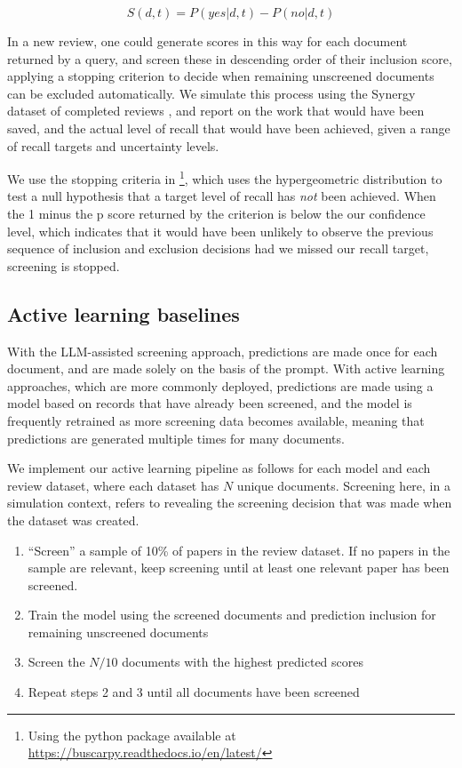 \documentclass{article}
\begin{document}
	\begin{equation}S(d,t) = P(yes|d,t) - P(no|d,t)\end{equation}
	
	In a new review, one could generate scores in this way for each document returned by a query, and screen these in descending order of their inclusion score, applying a stopping criterion to decide when remaining unscreened documents can be excluded automatically.  We simulate this process using the Synergy dataset of completed reviews \cite{de_bruin_synergy_2023}, and report on the work that would have been saved, and the actual level of recall that would have been achieved, given a range of recall targets and uncertainty levels.
	
	We use the stopping criteria in \cite{callaghan_statistical_2020}\footnote{Using the python package available at \url{https://buscarpy.readthedocs.io/en/latest/}}, which uses the hypergeometric distribution to test a null hypothesis that a target level of recall has \textit{not} been achieved. When the 1 minus the p score returned by the criterion is below the our confidence level, which indicates that it would have been unlikely to observe the previous sequence of inclusion and exclusion decisions had we missed our recall target, screening is stopped. 
	
	\subsection*{Active learning baselines}
	
	With the LLM-assisted screening approach, predictions are made once for each document, and are made solely on the basis of the prompt. With active learning approaches, which are more commonly deployed, predictions are made using a model based on records that have already been screened, and the model is frequently retrained as more screening data becomes available, meaning that predictions are generated multiple times for many documents.
	
	We implement our active learning pipeline as follows for each model and each review dataset, where each dataset has $N$ unique documents. Screening here, in a simulation context, refers to revealing the screening decision that was made when the dataset was created.
	
	\begin{enumerate}
		\item ``Screen'' a sample of 10\% of papers in the review dataset. If no papers in the sample are relevant, keep screening until at least one relevant paper has been screened.
		\item Train the model using the screened documents and prediction inclusion for remaining unscreened documents
		\item Screen the $N/10$ documents with the highest predicted scores 
		\item Repeat steps 2 and 3 until all documents have been screened
	\end{enumerate}
\end{document}
